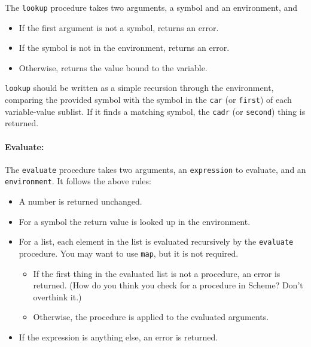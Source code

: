 \documentclass{article}
\begin{document}
The {\tt lookup} procedure takes two arguments, a symbol and an
environment, and
\begin{itemize}
\item If the first argument is not a symbol, returns an error.
\item If the symbol is not in the environment, returns an error.
\item Otherwise, returns the value bound to the variable.
\end{itemize}
{\tt lookup} should be written as a simple recursion through the
environment, comparing the provided symbol with the symbol in the
{\tt car} (or {\tt first})
of each variable-value sublist.  If it finds a matching
symbol, the {\tt cadr} (or {\tt second}) thing is returned.
  
\paragraph{Evaluate:}
The {\tt evaluate} procedure takes two arguments, an {\tt expression} to
evaluate, and an {\tt environment}.  It follows the above rules:
\begin{itemize}
\item A number is returned unchanged.
\item For a symbol the return value is looked up in the environment.
\item For a list, each element in the list is evaluated recursively by
  the {\tt evaluate} procedure.  You may
  want to use {\tt map}, but it is not required.
  \begin{itemize}
  \item If the first thing in the evaluated list is not a procedure,
    an error is returned.  (How do you think you check for a procedure
    in Scheme?  Don't overthink it.)
  \item Otherwise, the procedure is applied to the evaluated
    arguments.
  \end{itemize}
\item If the expression is anything else, an error is returned.
\end{itemize}
\end{document}
